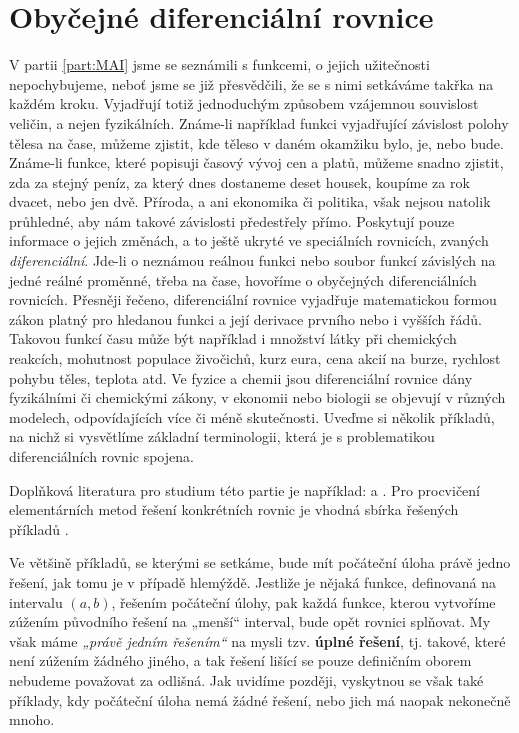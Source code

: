 \setchaptertoc
\chapter{Obyčejné diferenciální rovnice}\label{mai:IIchapIV}

  V partii \ref{part:MAI} jsme se seznámili s funkcemi, o jejich užitečnosti nepochybujeme, neboť
  jsme se již přesvědčili, že se s nimi setkáváme takřka na každém kroku. Vyjadřují totiž
  jednoduchým způsobem vzájemnou souvislost veličin, a nejen fyzikálních. Známe-li například funkci
  vyjadřující závislost polohy tělesa na čase, můžeme zjistit, kde těleso v daném okamžiku bylo, je,
  nebo bude. Známe-li funkce, které popisuji časový vývoj cen a platů, můžeme snadno zjistit, zda za
  stejný peníz, za který dnes dostaneme deset housek, koupíme za rok dvacet, nebo jen dvě. Příroda,
  a ani ekonomika či politika, však nejsou natolik průhledné, aby nám takové závislosti předestřely
  přímo. Poskytují pouze informace o jejich změnách, a to ještě ukryté ve speciálních rovnicích,
  zvaných \emph{diferenciální}. Jde-li o neznámou reálnou funkci nebo soubor funkcí závislých na
  jedné reálné proměnné, třeba na čase, hovoříme o obyčejných diferenciálních rovnicích. Přesněji
  řečeno, diferenciální rovnice vyjadřuje matematickou formou zákon platný pro hledanou funkci a
  její derivace prvního nebo i vyšších řádů. Takovou funkcí času může být například i množství látky
  při chemických reakcích, mohutnost populace živočichů, kurz eura, cena akcií na burze, rychlost
  pohybu těles, teplota atd. Ve fyzice a chemii jsou diferenciální rovnice dány fyzikálními či
  chemickými zákony, v ekonomii nebo biologii se objevují v různých modelech, odpovídajících více či
  méně skutečnosti. Uveďme si několik příkladů, na nichž si vysvětlíme základní terminologii, která
  je s problematikou diferenciálních rovnic spojena.
  
  Doplňková literatura pro studium této partie je například: \cite[s.~217]{Musilova2012MA2} a 
  \cite[s.~426]{Brabec1989}. Pro procvičení elementárních metod řešení konkrétních rovnic je vhodná 
  sbírka řešených příkladů \cite[s.~348]{Jirasek1989}.
  
    
  Ve většině příkladů, se kterými se setkáme, bude mít počáteční úloha právě jedno řešení, jak tomu
  je v případě hlemýždě. Jestliže je nějaká funkce, definovaná na intervalu \((a,b)\), řešením
  počáteční úlohy, pak každá funkce, kterou vytvoříme zúžením původního řešení na „menší“ interval,
  bude opět rovnici splňovat. My však máme \emph{„právě jedním řešením“} na mysli tzv. \textbf{úplné
  řešení}, tj. takové, které není zúžením žádného jiného, a tak řešení lišící se pouze definičním
  oborem nebudeme považovat za odlišná. Jak uvidíme později, vyskytnou se však také příklady, kdy
  počáteční úloha nemá žádné řešení, nebo jich má naopak nekonečně mnoho.

